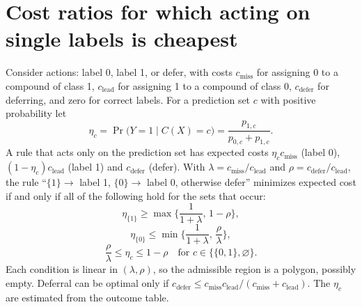 \documentclass[10pt]{article}
\begin{document}
\section{Cost ratios for which acting on single labels is cheapest}
\label{sec:costs}



Consider actions: label 0, label 1, or defer, with costs $c_{\text{miss}}$ for assigning 0 to a compound of class 1, $c_{\text{lead}}$ for assigning 1 to a compound of class 0, $c_{\text{defer}}$ for deferring, and zero for correct labels. For a prediction set $c$ with positive probability let
\begin{equation}
\eta_c=\Pr\big(Y=1\mid C(X)=c\big)=\frac{p_{1,c}}{p_{0,c}+p_{1,c}}.
\end{equation}
A rule that acts only on the prediction set has expected costs $\eta_c c_{\text{miss}}$ (label 0), $(1-\eta_c)c_{\text{lead}}$ (label 1) and $c_{\text{defer}}$ (defer). With $\lambda=c_{\text{miss}}/c_{\text{lead}}$ and $\rho=c_{\text{defer}}/c_{\text{lead}}$, the rule ``$\{1\}\to$ label 1, $\{0\}\to$ label 0, otherwise defer'' minimizes expected cost if and only if all of the following hold for the sets that occur:\citep{Chow1970}
\begin{equation}
\eta_{\{1\}}\ge\max\Big\{\frac{1}{1+\lambda},\,1-\rho\Big\},
\end{equation}
\begin{equation}
\eta_{\{0\}}\le\min\Big\{\frac{1}{1+\lambda},\,\frac{\rho}{\lambda}\Big\},
\end{equation}
\begin{equation}
\frac{\rho}{\lambda}\le\eta_c\le1-\rho\quad\text{for } c\in\{\{0,1\},\varnothing\}.
\end{equation}
Each condition is linear in $(\lambda,\rho)$, so the admissible region is a polygon, possibly empty. Deferral can be optimal only if $c_{\text{defer}}\le c_{\text{miss}}c_{\text{lead}}/(c_{\text{miss}}+c_{\text{lead}})$. The $\eta_c$ are estimated from the outcome table.
\end{document}
